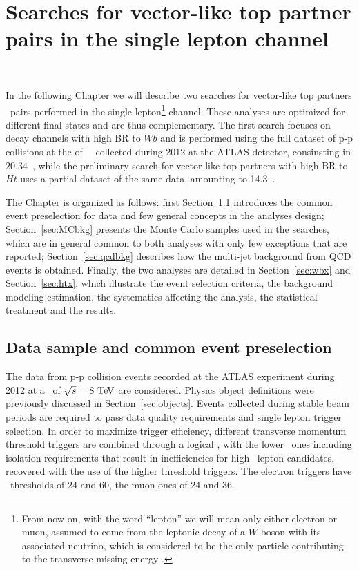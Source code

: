 \clearpage{\pagestyle{empty}\cleardoublepage}

\chapter{Searches for vector-like top partner pairs in the single lepton channel}~\label{chap:vlq}

In the following Chapter we will describe two searches for vector-like 
top partners \TTbar\ pairs performed in the single 
lepton\footnote{From now on, with the word ``lepton'' we will 
mean only either electron or muon, assumed to come from the leptonic
decay of a $W$ boson with its associated neutrino, which is considered
to be the only particle contributing to the transverse missing energy \met.} channel. 
These analyses
are optimized for different final states and are thus complementary.
The first search focuses on decay channels with high BR to $Wb$ and is 
performed using the full dataset of p-p collisions at the \cme of ~\tev\
collected during 2012 at the ATLAS detector, consinsting in 20.34~\ifb, while
the preliminary search for vector-like top partners with high BR to $Ht$
uses a partial dataset of the same data, amounting to 14.3~\ifb.

The Chapter is organized as follows: first Section~\ref{sec:presel}
introduces the common event preselection for data and few general concepts in the
analyses design; Section~\ref{sec:MCbkg}
presents the Monte Carlo samples used in the searches, which
are in general common to both analyses with only few exceptions that are reported;
Section~\ref{sec:qcdbkg} describes how the multi-jet background from QCD events is
obtained.
Finally, the two analyses are detailed in Section~\ref{sec:wbx} and Section~\ref{sec:htx}, 
which illustrate the event selection criteria, the background modeling estimation, 
the systematics affecting the analysis, the statistical treatment and the
results.

\section{Data sample and common event preselection}\label{sec:presel}

The data from p-p collision events recorded at the ATLAS experiment during
2012 at a \cme\ of $\rts=8\tev$ are considered. Physics object definitions 
were previously discussed in Section~\ref{sec:objects}.
Events collected during
stable beam periods are required to pass data quality requirements and
single lepton trigger selection. In order to maximize trigger
efficiency, different transverse momentum threshold triggers are combined
through a logical \OR, with the lower \pt\ ones including isolation requirements
that result in inefficiencies for high \pt\ lepton candidates, recovered with
the use of the higher threshold triggers. The electron triggers have
\pt\ thresholds of 24 and 60\gev, the muon ones of 24 and 36\gev.

